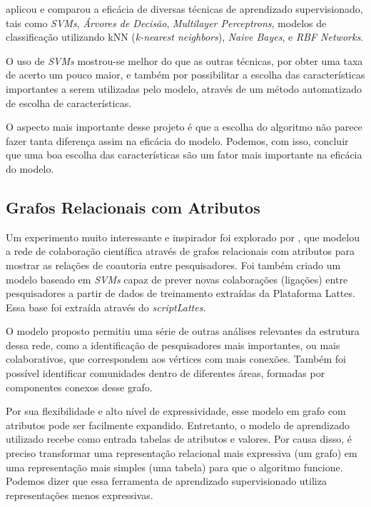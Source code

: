 \citet{MohammadAlHasan} aplicou e comparou a eficácia de diversas técnicas de aprendizado supervisionado, tais como  \textit{SVMs}, \textit{Árvores de Decisão}, \textit{Multilayer Perceptrons}, modelos de classificação utilizando kNN (\textit{k-nearest neighbors}), \textit{Naive Bayes}, e \textit{RBF Networks}.

O uso de \textit{SVMs} mostrou-se melhor do que as outras técnicas, por obter uma taxa de acerto um pouco maior, e também por possibilitar a escolha das características importantes a serem utilizadas pelo modelo, através de um método automatizado de escolha de características.

O aspecto mais importante desse projeto é que a escolha do algoritmo não parece fazer tanta diferença assim na eficácia do modelo. Podemos, com isso, concluir que uma boa escolha das características são um fator mais importante na eficácia do modelo.


\subsection{Grafos Relacionais com Atributos}
\label{ssec:graphs-with-attributes}

Um experimento muito interessante e inspirador foi explorado por \citet{Cervantes2014}, que modelou a rede de colaboração científica através de grafos relacionais com atributos para mostrar as relações de coautoria entre pesquisadores. Foi também criado um modelo baseado em \textit{SVMs} capaz de prever novas colaborações (ligações) entre pesquisadores a partir de dados de treinamento extraídas da Plataforma Lattes. Essa base foi extraída através do \textit{scriptLattes}.

O modelo proposto permitiu uma série de outras análises relevantes da estrutura dessa rede, como a identificação de pesquisadores mais importantes, ou mais colaborativos, que correspondem aos vértices com mais conexões. Também foi possível identificar comunidades dentro de diferentes áreas, formadas por componentes conexos desse grafo.

Por sua flexibilidade e alto nível de expressividade, esse modelo em grafo com atributos pode ser facilmente expandido. Entretanto, o modelo de aprendizado utilizado recebe como entrada tabelas de atributos e valores. Por causa disso, é preciso transformar uma representação relacional mais expressiva (um grafo) em uma representação mais simples (uma tabela) para que o algoritmo funcione. Podemos dizer que essa ferramenta de aprendizado supervisionado utiliza representações menos expressivas.


